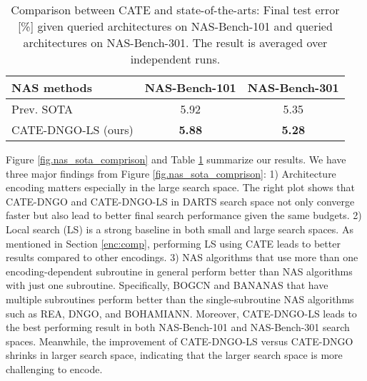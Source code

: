 \begin{table}[t]

\centering
\begin{adjustbox}{width=1.0\columnwidth}
{\small
\begin{tabular}{@{}l|c|c@{}}
\toprule
\multicolumn{1}{l}{\textbf{NAS methods}} & \multicolumn{1}{c}{\textbf{NAS-Bench-101}} & \multicolumn{1}{c}{\textbf{NAS-Bench-301}}\\
\midrule 
Prev. SOTA \cite{white2019bananas} & 5.92 & 5.35  \\ 
CATE-DNGO-LS (ours) & \textbf{5.88} & \textbf{5.28} \\
\bottomrule
\end{tabular}
}
\end{adjustbox}
\caption{Comparison between CATE and state-of-the-arts: Final test error [\%] given  queried architectures on NAS-Bench-101 and  queried architectures on NAS-Bench-301. The result is averaged over  independent runs.}
\label{table:nasbench101-nasbench301-query-comparison}
\end{table}


Figure \ref{fig.nas_sota_comprison} and Table \ref{table:nasbench101-nasbench301-query-comparison} summarize our results. We have three major findings from Figure \ref{fig.nas_sota_comprison}:
1) Architecture encoding matters especially in the large search space. The right plot shows that CATE-DNGO and CATE-DNGO-LS in DARTS search space not only converge faster but also lead to better final search performance given the same budgets.
2) Local search (LS) is a strong baseline in both small and large search spaces. As mentioned in Section \ref{enc:comp}, performing LS using CATE leads to better results compared to other encodings.
3) NAS algorithms that use more than one encoding-dependent subroutine in general perform better than NAS algorithms with just one subroutine. Specifically, BOGCN and BANANAS that have multiple subroutines perform better than the single-subroutine NAS algorithms such as REA, DNGO, and BOHAMIANN.
Moreover, CATE-DNGO-LS leads to the best performing result in both NAS-Bench-101 and NAS-Bench-301 search spaces.
Meanwhile, the improvement of CATE-DNGO-LS versus CATE-DNGO shrinks in larger search space, indicating that the larger search space is more challenging to encode.


